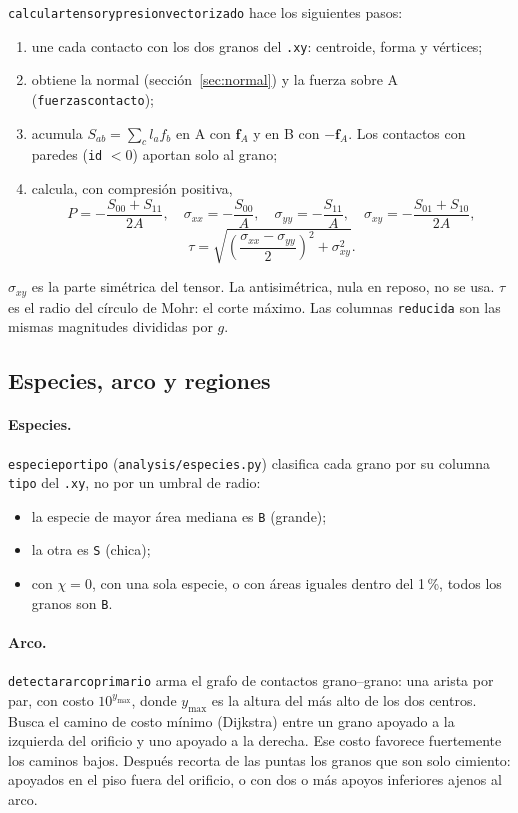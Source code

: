 \documentclass[11pt,a4paper]{article}
\newcommand{\vect}[1]{\mathbf{#1}}
\newcommand{\f}{\vect{f}}
\newcommand{\codeus}{\textunderscore\allowbreak}
\newcommand{\code}[1]{\texttt{\begingroup\let\_\codeus#1\endgroup}}
\begin{document}
\code{calcular\_tensor\_y\_presion\_vectorizado} hace los siguientes
pasos:
\begin{enumerate}
  \item une cada contacto con los dos granos del \code{.xy}: centroide,
    forma y vértices;
  \item obtiene la normal (sección~\ref{sec:normal}) y la fuerza sobre A
    (\code{fuerzas\_contacto});
  \item acumula $S_{ab} = \sum_c l_a f_b$ en A con $\f_A$ y en B con
    $-\f_A$. Los contactos con paredes (\code{id} $<0$) aportan solo al
    grano;
  \item calcula, con compresión positiva,
    \begin{equation}
      P = -\frac{S_{00}+S_{11}}{2A}, \quad
      \sigma_{xx} = -\frac{S_{00}}{A}, \quad
      \sigma_{yy} = -\frac{S_{11}}{A}, \quad
      \sigma_{xy} = -\frac{S_{01}+S_{10}}{2A},
    \end{equation}
    \begin{equation}
      \tau = \sqrt{\left(\frac{\sigma_{xx}-\sigma_{yy}}{2}\right)^2
                   + \sigma_{xy}^2}.
    \end{equation}
\end{enumerate}
$\sigma_{xy}$ es la parte simétrica del tensor. La antisimétrica, nula en
reposo, no se usa. $\tau$ es el radio del círculo de Mohr: el corte
máximo. Las columnas \code{\_reducida} son las mismas magnitudes
divididas por $g$.

\subsection{Especies, arco y regiones}

\paragraph{Especies.} \code{especie\_por\_tipo} (\code{analysis/especies.py})
clasifica cada grano por su columna \code{tipo} del \code{.xy}, no por un
umbral de radio:
\begin{itemize}
  \item la especie de mayor área mediana es \code{B} (grande);
  \item la otra es \code{S} (chica);
  \item con $\chi = 0$, con una sola especie, o con áreas iguales dentro
    del 1\,\%, todos los granos son \code{B}.
\end{itemize}

\paragraph{Arco.} \code{detectar\_arco\_primario} arma el grafo de
contactos grano--grano: una arista por par, con costo $10^{y_\text{max}}$,
donde $y_\text{max}$ es la altura del más alto de los dos centros. Busca
el camino de costo mínimo (Dijkstra) entre un grano apoyado a la
izquierda del orificio y uno apoyado a la derecha. Ese costo favorece
fuertemente los caminos bajos. Después recorta de las puntas los granos
que son solo cimiento: apoyados en el piso fuera del orificio, o con dos o
más apoyos inferiores ajenos al arco.
\end{document}

